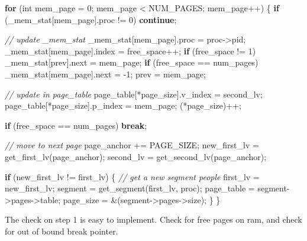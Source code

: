 \documentclass[]{article}
\newenvironment{Shaded}{}{}
\newcommand{\DataTypeTok}[1]{\textcolor[rgb]{0.56,0.13,0.00}{#1}}
\newcommand{\DecValTok}[1]{\textcolor[rgb]{0.25,0.63,0.44}{#1}}
\newcommand{\CommentTok}[1]{\textcolor[rgb]{0.38,0.63,0.69}{\textit{#1}}}
\newcommand{\ControlFlowTok}[1]{\textcolor[rgb]{0.00,0.44,0.13}{\textbf{#1}}}
\newcommand{\NormalTok}[1]{#1}
\begin{document}
\begin{Shaded}
\begin{Highlighting}[]
\ControlFlowTok{for}\NormalTok{ (}\DataTypeTok{int}\NormalTok{ mem_page = }\DecValTok{0}\NormalTok{; mem_page < NUM_PAGES; mem_page++) \{}
      \ControlFlowTok{if}\NormalTok{ (_mem_stat[mem_page].proc != }\DecValTok{0}\NormalTok{)}
            \ControlFlowTok{continue}\NormalTok{;}

      \CommentTok{// update _mem_stat}
\NormalTok{      _mem_stat[mem_page].proc = proc->pid;}
\NormalTok{      _mem_stat[mem_page].index = free_space++;}
      \ControlFlowTok{if}\NormalTok{ (free_space != }\DecValTok{1}\NormalTok{)}
\NormalTok{            _mem_stat[prev].next = mem_page;}
      \ControlFlowTok{if}\NormalTok{ (free_space == num_pages)}
\NormalTok{            _mem_stat[mem_page].next = }\DecValTok{-1}\NormalTok{;}
\NormalTok{      prev = mem_page;}

      \CommentTok{// update in page_table}
\NormalTok{      page_table[*page_size].v_index = second_lv;}
\NormalTok{      page_table[*page_size].p_index = mem_page;}
\NormalTok{      (*page_size)++;}

      \ControlFlowTok{if}\NormalTok{ (free_space == num_pages)}
            \ControlFlowTok{break}\NormalTok{;}

      \CommentTok{// move to next page}
\NormalTok{      page_anchor += PAGE_SIZE;}
\NormalTok{      new_first_lv = get_first_lv(page_anchor);}
\NormalTok{      second_lv = get_second_lv(page_anchor);}

      \ControlFlowTok{if}\NormalTok{ (new_first_lv != first_lv) \{}
            \CommentTok{// get a new segment people}
\NormalTok{            first_lv = new_first_lv;}
\NormalTok{            segment = get_segment(first_lv, proc);}
\NormalTok{            page_table = segment->pages->table;}
\NormalTok{            page_size = &(segment->pages->size);}
\NormalTok{      \}}
\NormalTok{\}}
\end{Highlighting}
\end{Shaded}

The check on step 1 is easy to implement. Check for free pages on ram,
and check for out of bound break pointer.
\end{document}

